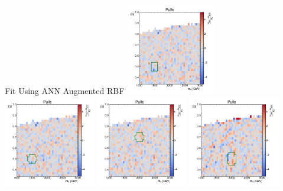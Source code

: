 \documentclass[10pt]{beamer}
\begin{document}
\begin{frame}{Fit Using ANN Augmented RBF}
  \makegrid%
  {}%
  {\includegraphics[width=0.3\textwidth]{figures/2dpullplots/nnrbf_32_16_8/E_1500_0p5_100_0p05.pdf}}%
  {\includegraphics[width=0.3\textwidth]{figures/2dpullplots/nnrbf_32_16_8/E_1500_0p5_150_0p05.pdf}}%
  { }%
  {\includegraphics[width=0.3\textwidth]{figures/2dpullplots/nnrbf_32_16_8/E_2000_0p7_150_0p05.pdf}}%
  {\includegraphics[width=0.3\textwidth]{figures/2dpullplots/nnrbf_32_16_8/E_2000_0p5_150_0p07.pdf}}%


\end{frame}
\end{document}
